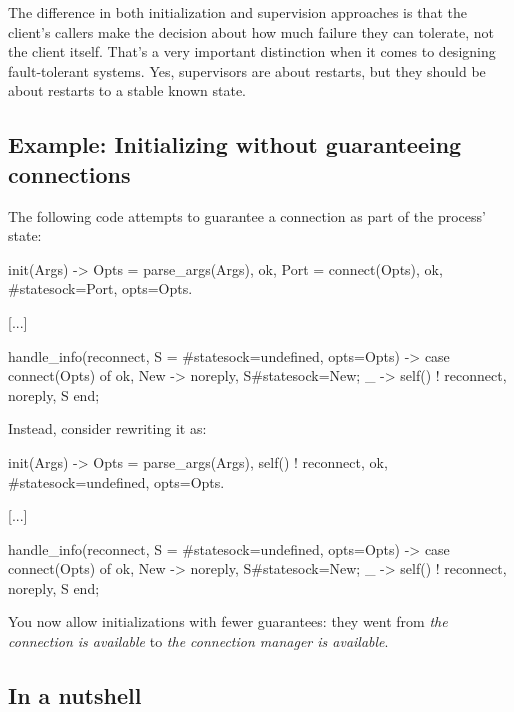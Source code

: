 The difference in both initialization and supervision approaches is that the client's callers make the decision about how much failure they can tolerate, not the client itself. That's a very important distinction when it comes to designing fault-tolerant systems. Yes, supervisors are about restarts, but they should be about restarts to a stable known state.

\subsection{Example: Initializing without guaranteeing connections}
\label{subsec:start-link-initializing-without-guaranteeing-connections}

The following code attempts to guarantee a connection as part of the process' state:

\begin{VerbatimText}
init(Args) ->
    Opts = parse_args(Args),
    {ok, Port} = connect(Opts),
    {ok, #state{sock=Port, opts=Opts}}.

[...]

handle_info(reconnect, S = #state{sock=undefined, opts=Opts}) ->
    case connect(Opts) of
        {ok, New} -> {noreply, S#state{sock=New}};
         _ -> self() ! reconnect, {noreply, S}
    end;
\end{VerbatimText}

Instead, consider rewriting it as:

\begin{VerbatimText}
init(Args) ->
    Opts = parse_args(Args),
    self() ! reconnect,
    {ok, #state{sock=undefined, opts=Opts}}.

[...]

handle_info(reconnect, S = #state{sock=undefined, opts=Opts}) ->
    case connect(Opts) of
        {ok, New} -> {noreply, S#state{sock=New}};
        _ -> self() ! reconnect, {noreply, S}
    end;
\end{VerbatimText}

You now allow initializations with fewer guarantees: they went from \emph{the connection is available} to \emph{the connection manager is available}.

\subsection{In a nutshell}
\label{subsec:start-link-in-a-nutshell}

